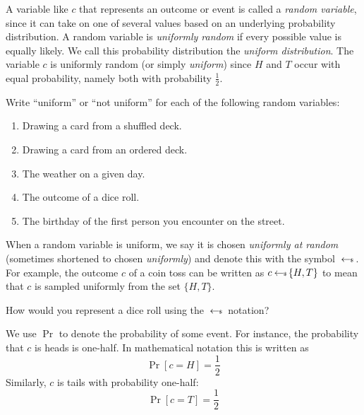 A variable like $c$ that represents an outcome or event is called a \emph{random 
variable}, since it can take on one of several values based on an underlying 
probability distribution. A random variable is \emph{uniformly random} if every possible 
value is equally likely. We call this probability distribution the 
\emph{uniform distribution}. The variable $c$ is uniformly random (or simply \emph{uniform})
since $H$ and $T$ occur with equal probability, namely both with probability 
$\frac{1}{2}$.

\begin{exercise}
    Write ``uniform'' or ``not uniform'' for each of the following random variables:
    \renewcommand{\labelenumi}{(\alph{enumi})} 
    \begin{enumerate}
        \item Drawing a card from a shuffled deck.
        \item Drawing a card from an ordered deck.
        \item The weather on a given day.
        \item The outcome of a dice roll.
        \item The birthday of the first person you encounter on the street.
    \end{enumerate}
\end{exercise}

When a random variable is uniform, we say it is chosen \emph{uniformly at random} 
(sometimes shortened to chosen \emph{uniformly}) and denote this with the symbol 
$\hskip2.3pt{\gets\!\!\mbox{\tiny${\$}$\normalsize}}\,$. For example, the outcome $c$ of a coin toss can be written as $c \hskip2.3pt{\gets\!\!\mbox{\tiny${\$}$\normalsize}}\, 
\{H, T\}$ to mean that $c$ is sampled uniformly from the set $\{H, T\}$. 

\begin{exercise}
    How would you represent a dice roll using the $\hskip2.3pt{\gets\!\!\mbox{\tiny${\$}$\normalsize}}\,$ notation?
\end{exercise}

We use $\Pr$ to denote the probability of some event. For instance, the 
probability that $c$ is heads is one-half. In mathematical notation this
is written as
\[
    \Pr[c=H] = \frac{1}{2}
\]
Similarly, $c$ is tails with probability one-half:
\[
    \Pr[c=T] = \frac{1}{2}
\]

